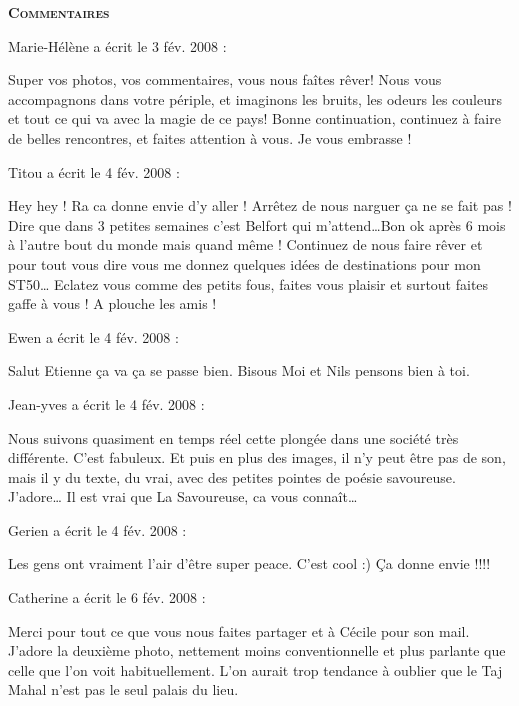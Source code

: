 \bigskip
\textbf{\textsc{Commentaires}}

\medskip
Marie-Hélène a écrit le 3 fév. 2008 :
\begin{displayquote}
Super vos photos, vos commentaires, vous nous faîtes rêver! Nous vous accompagnons dans votre périple, et imaginons les bruits, les odeurs les couleurs et tout ce qui va avec la magie de ce pays!
Bonne continuation, continuez à faire de belles rencontres, et faites attention à vous.
Je vous embrasse !
\end{displayquote}

\medskip
Titou a écrit le 4 fév. 2008 :
\begin{displayquote}
Hey hey ! Ra ca donne envie d'y aller ! Arrêtez de nous narguer ça ne se fait pas ! Dire que dans 3 petites semaines c'est Belfort qui m'attend\dots Bon ok après 6 mois à l'autre bout du monde mais quand même ! Continuez de nous faire rêver et pour tout vous dire vous me donnez quelques idées de destinations pour mon ST50\dots
Eclatez vous comme des petits fous, faites vous plaisir et surtout faites gaffe à vous ! A plouche les amis !
\end{displayquote}

\medskip
Ewen a écrit le 4 fév. 2008 :
\begin{displayquote}
Salut Etienne ça va ça se passe	bien.
Bisous Moi et Nils pensons bien à toi.
\end{displayquote}

\medskip
Jean-yves a écrit le 4 fév. 2008 :
\begin{displayquote}
Nous suivons quasiment en temps réel cette plongée dans une société très différente. C'est fabuleux. Et puis en plus des images, il n'y peut être pas de son, mais il y du texte, du vrai, avec des petites pointes de poésie savoureuse. J'adore\dots
Il est vrai que La Savoureuse, ca vous connaît\dots
\end{displayquote}

\medskip
Gerien a écrit le 4 fév. 2008 :
\begin{displayquote}
Les gens ont vraiment l'air d'être super peace. C'est cool :)
Ça donne envie !!!!
\end{displayquote}

\medskip
Catherine a écrit le 6 fév. 2008 :
\begin{displayquote}
Merci pour tout ce que vous nous faites partager et à Cécile pour son mail.
J'adore la deuxième photo, nettement moins conventionnelle et plus parlante que celle que l'on voit habituellement. L'on aurait trop tendance à oublier que le Taj Mahal n'est pas le seul palais du lieu.
\end{displayquote}


